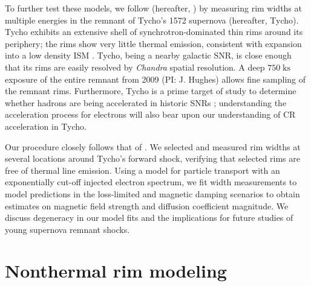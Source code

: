 \documentclass[iop, apj, numberedappendix]{emulateapj}
\newcommand*{\mt}{\mathrm}
\newcommand*{\unit}[1]{\;\mt{#1}}  %
\begin{document}
To further test these models, we follow \citet{ressler2014} (hereafter,
) by measuring rim widths at multiple energies in the
remnant of Tycho's 1572 supernova (hereafter, Tycho).  Tycho exhibits an
extensive shell of synchrotron-dominated thin rims around its periphery; the
rims show very little thermal emission, consistent with expansion into a low
density ISM \citep{williams2013}.  Tycho, being a nearby galactic SNR, is close
enough that its rims are easily resolved by \textit{Chandra} spatial
resolution. A deep $750 \unit{ks}$ exposure of the entire remnant from 2009
(PI: J. Hughes) allows fine sampling of the remnant rims.  Furthermore, Tycho
is a prime target of study to determine whether hadrons are being accelerated
in historic SNRs \citep[and references therein]{morlino2012}; understanding the
acceleration process for electrons will also bear upon our understanding of CR
acceleration in Tycho.

Our procedure closely follows that of .
We selected and measured rim widths at several locations around Tycho's forward
shock, verifying that selected rims are free of thermal line emission.  Using a
model for particle transport with an exponentially cut-off injected electron
spectrum, we fit width measurements to model predictions in the loss-limited
and magnetic damping scenarios to obtain estimates on magnetic field strength
and diffusion coefficient magnitude.  We discuss degeneracy in our model fits
and the implications for future studies of young supernova remnant shocks.

\section{Nonthermal rim modeling}\label{sec:models}

\end{document}
